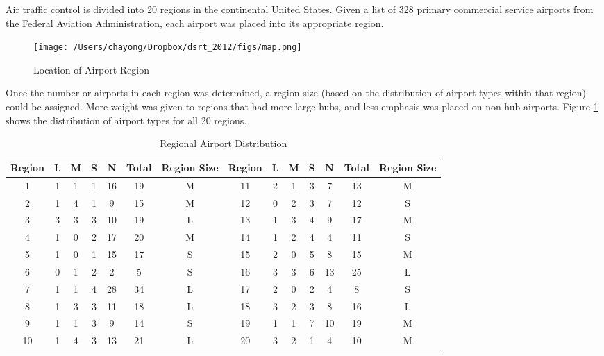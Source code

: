 Air traffic control is divided into 20 regions in the continental United States. Given a list of 328
primary commercial service airports from the Federal Aviation Administration, each airport was
placed into its appropriate region.

\begin{figure} [htb]
\centering
\texttt{[image: /Users/chayong/Dropbox/dsrt\_2012/figs/map.png]}
\caption{Location of Airport Region}
\label{fig:airport_region}
\end{figure}


Once the number or airports in each region was determined, a region size (based on the
distribution of airport types within that region) could be assigned. More weight was given to
regions that had more large hubs, and less emphasis was placed on non-hub airports.
Figure \ref{fig:airport_region} shows the distribution of airport types for all 20 regions.

\begin{table} [htb]
\begin{center}
\addtolength{\tabcolsep}{-0pt}
\tiny
\caption{Regional Airport Distribution}
\label{table:regional_airport_dist}
\begin{tabular}{|c|c|c|c|c|c|c|c|c|c|c|c|c|c|}\hline

Region & L & M & S & N & Total & Region Size & Region & L & M & S & N & Total & Region Size  \\\hline
1 & 1 & 1 & 1 & 16 & 19 & M & 11 & 2 & 1 & 3 & 7 & 13 & M  \\\hline
2 & 1 & 4 & 1 & 9 & 15 & M & 12 & 0 & 2 & 3 & 7 & 12 & S  \\\hline
3 & 3 & 3 & 3 & 10 & 19 & L & 13 & 1 & 3 & 4 & 9 & 17 & M  \\\hline
4 & 1 & 0 & 2 & 17 & 20 & M & 14 & 1 & 2 & 4 & 4 & 11 & S  \\\hline
5 & 1 & 0 & 1 & 15 & 17 & S & 15 & 2 & 0 & 5 & 8 & 15 & M  \\\hline
6 & 0 & 1 & 2 & 2  & 5 & S & 16 & 3 & 3 & 6 & 13 & 25 & L  \\\hline
7 & 1 & 1 & 4 & 28 & 34 & L & 17 & 2 & 0 & 2 & 4 & 8 & S  \\\hline
8 & 1 & 3 & 3 & 11 & 18 & L & 18 & 3 & 2 & 3 & 8 & 16 & L  \\\hline
9 & 1 & 1 & 3 & 9 & 14 & S & 19 & 1 & 1 & 7 & 10 & 19 & M  \\\hline
10 & 1 & 4 & 3 & 13 & 21 & L & 20 & 3 & 2 & 1 & 4 & 10 & M  \\\hline
\end{tabular}
\end{center}
\end{table}

